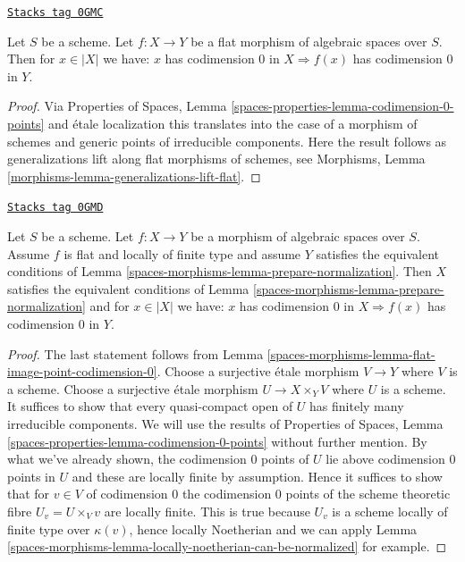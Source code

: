 \begin{lemma}
\label{spaces-morphisms-lemma-flat-image-point-codimension-0}
\href{https://stacks.math.columbia.edu/tag/0GMC}{\texttt{Stacks tag 0GMC}}

Let $S$ be a scheme. Let $f : X \to Y$ be a flat morphism of algebraic
spaces over $S$. Then for $x \in |X|$ we have: $x$ has codimension $0$ in
$X \Rightarrow f(x)$ has codimension $0$ in $Y$.
\end{lemma}

\begin{proof}
Via Properties of Spaces, Lemma
\ref{spaces-properties-lemma-codimension-0-points} and \'etale localization
this translates into the case of a morphism of schemes and generic points
of irreducible components. Here the result follows as generalizations lift
along flat morphisms of schemes, see
Morphisms, Lemma \ref{morphisms-lemma-generalizations-lift-flat}.
\end{proof}

\begin{lemma}
\label{spaces-morphisms-lemma-flat-locally-finite-type-points-codimension-0}
\href{https://stacks.math.columbia.edu/tag/0GMD}{\texttt{Stacks tag 0GMD}}

Let $S$ be a scheme. Let $f : X \to Y$ be a morphism of algebraic
spaces over $S$. Assume $f$ is flat and locally of finite type and
assume $Y$ satisfies the equivalent conditions of
Lemma \ref{spaces-morphisms-lemma-prepare-normalization}.
Then $X$ satisfies the equivalent conditions of
Lemma \ref{spaces-morphisms-lemma-prepare-normalization} and for $x \in |X|$ we have:
$x$ has codimension $0$ in $X \Rightarrow f(x)$ has codimension $0$ in $Y$.
\end{lemma}

\begin{proof}
The last statement follows from
Lemma \ref{spaces-morphisms-lemma-flat-image-point-codimension-0}.
Choose a surjective \'etale morphism $V \to Y$ where $V$ is a scheme.
Choose a surjective \'etale morphism $U \to X \times_Y V$ where $U$
is a scheme. It suffices to show that every quasi-compact open
of $U$ has finitely many irreducible components.
We will use the results of
Properties of Spaces, Lemma \ref{spaces-properties-lemma-codimension-0-points}
without further mention. By what we've
already shown, the codimension $0$ points of $U$ lie above
codimension $0$ points in $U$ and these are locally finite by
assumption. Hence it suffices to show that for $v \in V$ of codimension $0$
the codimension $0$ points of the scheme theoretic fibre $U_v = U \times_V v$
are locally finite. This is true because $U_v$ is a scheme
locally of finite type over $\kappa(v)$, hence locally Noetherian
and we can apply Lemma \ref{spaces-morphisms-lemma-locally-noetherian-can-be-normalized}
for example.
\end{proof}

